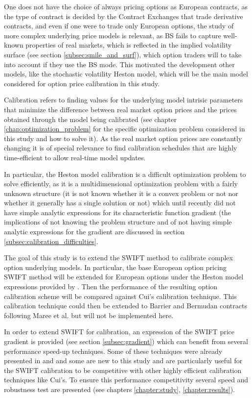 \documentclass[12,twoside]{mammeTFM}
\theoremstyle{definition}
\theoremstyle{remark}
\begin{document}
One does not have the choice of always pricing options as European contracts, as the type of contract is decided by the Contract Exchanges that trade derivative contracts, and even if one were to trade only European options, the study of more complex underlying price models is relevant, as BS fails to capture well-known properties of real markets, which is reflected in the implied volatility surface (see section \ref{subsec:smile_and_surf}), which option traders will to take into account if they use the BS mode. This motivated the development other models, like the stochastic volatility Heston model, which will be the main model considered for option price calibration in this study.

Calibration refers to finding values for the underlying model intrisic parameters that minimize the difference between real market option prices and the prices obtained through the model being calibrated (see chapter \ref{chap:optimization_problem} for the specific optimization problem considered in this study and how to solve it). As the real market option prices are constantly changing it is of special relevance to find calibration schedules that are highly time-efficient to allow real-time model updates.

In particular, the Heston model calibration is a difficult optimization problem to solve efficiently, as it is a multidimensional optimization problem with a fairly unknown structure (it is not known whether it is a convex problem or not nor whether it generally has a single solution or not) which until recently did not have simple analytic expressions for its characteristic function gradient \cite{cui17} (the implications of not knowing the problem structure and of not having simple analytic expressions for the gradient are discussed in section \ref{subsec:calibration_difficulties}.

The goal of this study is to extend the SWIFT method to calibrate complex option underlying models. In particular, the base European option pricing SWIFT method will be extended for European options under the Heston model expressions provided by \cite{cui17}. Then the performance of the resulting option calibration scheme will be compared against Cui's calibration technique. This calibration technique could then be extended to Barrier and Bermudan contracts following Maree et al. \cite{mar17} but will not be implemented here.

In order to extend SWIFT for calibration, an expression of the SWIFT price gradient is provided (see section \ref{subsec:gradient}) which can benefit from several performance speed-up techniques. Some of these techniques were already presented in \cite{Ortiz-Gracia2016} and \cite{mar17} and some are new to this study and are particularly useful for the SWIFT calibration to be competitive with other highly efficient calibration techniques like Cui's. To ensure this performance competitivity several speed and robustness test are presented (see chapters \ref{chapter:study}, \ref{chapter:results}).
\end{document}
